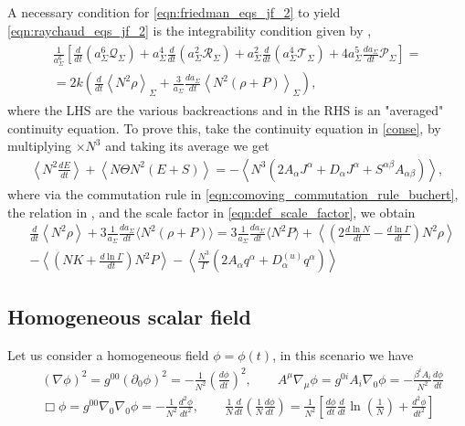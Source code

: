 A necessary condition for \cref{eqn:friedman_eqs_jf_2} to yield \cref{eqn:raychaud_eqs_jf_2} is the integrability condition given by \cite{Buchert_2020},
\begin{align}
\begin{gathered}
\frac{1}{a_\Sigma^6}\left[\frac{d}{d t}\left(a_\Sigma^6\mathcal{Q}_{\Sigma}\right)+a_\Sigma^4\frac{d}{dt}\left(a_\Sigma^2\mathcal{R}_{\Sigma}\right)+a_\Sigma^2\frac{d}{dt}\left(a_\Sigma^4 \mathcal{T}_{\Sigma}\right)+4a_\Sigma^5\frac{da_\Sigma}{dt}\mathcal{P}_{\Sigma}\right]=\nonumber \\
=2k\left(\frac{d}{d t}\left\langle N^2 \rho\right\rangle_{\Sigma}+\frac{3}{a_{\Sigma}} \frac{d a_{\Sigma}}{d t}\left\langle N^2(\rho+P)\right\rangle_{\Sigma}\right),
\end{gathered}
\end{align}
where the LHS are the various backreactions and in the RHS is an "averaged" continuity equation. 
To prove this, take the continuity equation in \cref{conse}, by multiplying $\times N^3$ and taking its average we get
\begin{align}
    \left\langle N^2\frac{d E}{dt}\right\rangle + \left\langle N\Theta N^2(E+S)\right\rangle =  -\left\langle N^3\left( 2 A_\alpha J^\alpha +  D_\alpha J^\alpha+ S^{\alpha\beta}A_{\alpha\beta}\right)\right\rangle,
\end{align}
where via the commutation rule in \cref{eqn:comoving_commutation_rule_buchert}, the relation in , and the scale factor in \cref{eqn:def_scale_factor}, we obtain
\begin{align}
    &\frac{d}{dt}\left\langle N^2\rho\right\rangle+3\frac{1}{a_\Sigma}\frac{da_\Sigma}{dt}\langle N^2(\rho+P)\rangle=3\frac{1}{a_\Sigma}\frac{da_\Sigma}{dt}\langle N^2P\rangle+\left\langle \left(2\frac{d\ln N}{dt}-\frac{d\ln \Gamma}{dt}\right)N^2\rho\right\rangle\\
    &-\left\langle\left(NK+\frac{d\ln\Gamma}{dt}\right)N^2P\right\rangle-\left\langle \frac{N^3}{\Gamma}\left(2A_\alpha q^\alpha+D^{(u)}_\alpha q^\alpha\right)\right\rangle
\end{align}




\subsection{Homogeneous scalar field}

Let us consider a homogeneous field $\phi=\phi(t)$, in this scenario we have
\begin{align}
    &(\nabla\phi)^2=g^{00}(\partial_0\phi)^2=-\frac{1}{N^2}\left(\frac{d\phi}{dt}\right)^2, \qquad A^\mu\nabla_\mu\phi=g^{0i}A_i\nabla_0\phi=-\frac{\beta^i A_i}{N^2}\frac{d\phi}{dt}\\
    &\Box\phi=g^{00}\nabla_0\nabla_0\phi=-\frac{1}{N^2}\frac{d^2\phi}{dt^2},\qquad \frac{1}{N}\frac{d}{dt}\left(\frac{1}{N}\frac{d\phi}{dt}\right)=\frac{1}{N^2}\left[\frac{d\phi}{dt}\frac{d}{dt}\ln\left(\frac{1}{N}\right)+\frac{d^2\phi}{dt^2}\right]
\end{align}










